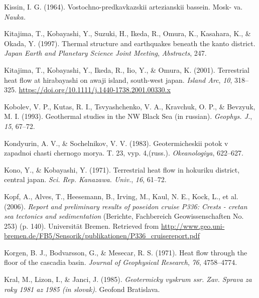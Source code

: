 \documentclass[draft,linenumbers]{agujournal2018}
\begin{document}
\leavevmode{}%
Kissin, I. G. (1964). Vostochno-predkavkazskii artezianskii bassein.
Mosk- va. \emph{Nauka.}

\leavevmode{}%
Kitajima, T., Kobayashi, Y., Suzuki, H., Ikeda, R., Omura, K., Kasahara,
K., \& Okada, Y. (1997). Thermal structure and earthquakes beneath the
kanto district. \emph{Japan Earth and Planetary Science Joint Meeting},
\emph{Abstracts}, 247.

\leavevmode{}%
Kitajima, T., Kobayashi, Y., Ikeda, R., Iio, Y., \& Omura, K. (2001).
Terrestrial heat flow at hirabayashi on awaji island, south-west japan.
\emph{Island Arc}, \emph{10}, 318--325.
\url{https://doi.org/10.1111/j.1440-1738.2001.00330.x}

\leavevmode{}%
Kobolev, V. P., Kutas, R. I., Tsvyashchenko, V. A., Kravchuk, O. P., \&
Bevzyuk, M. I. (1993). Geothermal studies in the {NW Black Sea} (in
russian). \emph{Geophys. J.}, \emph{15}, 67--72.

\leavevmode{}%
Kondyurin, A. V., \& Sochelnikov, V. V. (1983). Geotermicheskii potok v
zapadnoi chasti chernogo morya. T. 23, vyp. 4,(russ.).
\emph{Okeanologiya}, 622--627.

\leavevmode{}%
Kono, Y., \& Kobayashi, Y. (1971). Terrestrial heat flow in hokuriku
district, central japan. \emph{Sci. Rep. Kanazawa. Univ.}, \emph{16},
61--72.

\leavevmode{}%
Kopf, A., Alves, T., Heesemann, B., Irving, M., Kaul, N. E., Kock, L.,
et al. (2006). \emph{Report and preliminary results of poseidon cruise
P336: Crests - cretan sea tectonics and sedimentation} (Berichte,
Fachbereich Geowissenschaften No. 253) (p. 140). Universität Bremen.
Retrieved from
\url{http://www.geo.uni-bremen.de/FB5/Sensorik/publikationen/P336_cruisereport.pdf}

\leavevmode{}%
Korgen, B. J., Bodvarsson, G., \& Mesecar, R. S. (1971). Heat flow
through the floor of the cascadia basin. \emph{Journal of Geophysical
Research}, \emph{76}, 4758--4774.

\leavevmode{}%
Kral, M., Lizon, I., \& Janci, J. (1985). \emph{Geotermicky vyskrum ssr.
Zav. Sprava za roky 1981 az 1985 (in slovak)}. Geofond Bratislava.
\end{document}
